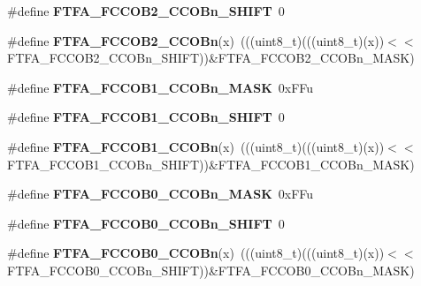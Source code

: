 \begin{DoxyCompactItemize}
\#define {\bfseries F\+T\+F\+A\+\_\+\+F\+C\+C\+O\+B2\+\_\+\+C\+C\+O\+Bn\+\_\+\+S\+H\+I\+FT}~0
\item 
\mbox{\label{group___f_t_f_a___register___masks_ga0b76c510573ac191f77fea543c3d36aa}} 
\#define {\bfseries F\+T\+F\+A\+\_\+\+F\+C\+C\+O\+B2\+\_\+\+C\+C\+O\+Bn}(x)~(((uint8\+\_\+t)(((uint8\+\_\+t)(x))$<$$<$F\+T\+F\+A\+\_\+\+F\+C\+C\+O\+B2\+\_\+\+C\+C\+O\+Bn\+\_\+\+S\+H\+I\+FT))\&F\+T\+F\+A\+\_\+\+F\+C\+C\+O\+B2\+\_\+\+C\+C\+O\+Bn\+\_\+\+M\+A\+SK)
\item 
\mbox{\label{group___f_t_f_a___register___masks_ga17fce81c2555358f011d813a6f3904ac}} 
\#define {\bfseries F\+T\+F\+A\+\_\+\+F\+C\+C\+O\+B1\+\_\+\+C\+C\+O\+Bn\+\_\+\+M\+A\+SK}~0x\+F\+Fu
\item 
\mbox{\label{group___f_t_f_a___register___masks_ga077f35706cef4a20a363eb6980f65baf}} 
\#define {\bfseries F\+T\+F\+A\+\_\+\+F\+C\+C\+O\+B1\+\_\+\+C\+C\+O\+Bn\+\_\+\+S\+H\+I\+FT}~0
\item 
\mbox{\label{group___f_t_f_a___register___masks_ga4c29d83b6a844036b07db102da1daf0e}} 
\#define {\bfseries F\+T\+F\+A\+\_\+\+F\+C\+C\+O\+B1\+\_\+\+C\+C\+O\+Bn}(x)~(((uint8\+\_\+t)(((uint8\+\_\+t)(x))$<$$<$F\+T\+F\+A\+\_\+\+F\+C\+C\+O\+B1\+\_\+\+C\+C\+O\+Bn\+\_\+\+S\+H\+I\+FT))\&F\+T\+F\+A\+\_\+\+F\+C\+C\+O\+B1\+\_\+\+C\+C\+O\+Bn\+\_\+\+M\+A\+SK)
\item 
\mbox{\label{group___f_t_f_a___register___masks_ga5b8b3b721c731e331fb126491693baf4}} 
\#define {\bfseries F\+T\+F\+A\+\_\+\+F\+C\+C\+O\+B0\+\_\+\+C\+C\+O\+Bn\+\_\+\+M\+A\+SK}~0x\+F\+Fu
\item 
\mbox{\label{group___f_t_f_a___register___masks_gaab9715b8a9e69d256acd31421b32ce97}} 
\#define {\bfseries F\+T\+F\+A\+\_\+\+F\+C\+C\+O\+B0\+\_\+\+C\+C\+O\+Bn\+\_\+\+S\+H\+I\+FT}~0
\item 
\mbox{\label{group___f_t_f_a___register___masks_gaea8b726f8e7f7efdb8ce4acbabe06495}} 
\#define {\bfseries F\+T\+F\+A\+\_\+\+F\+C\+C\+O\+B0\+\_\+\+C\+C\+O\+Bn}(x)~(((uint8\+\_\+t)(((uint8\+\_\+t)(x))$<$$<$F\+T\+F\+A\+\_\+\+F\+C\+C\+O\+B0\+\_\+\+C\+C\+O\+Bn\+\_\+\+S\+H\+I\+FT))\&F\+T\+F\+A\+\_\+\+F\+C\+C\+O\+B0\+\_\+\+C\+C\+O\+Bn\+\_\+\+M\+A\+SK)
$$
\end{DoxyCompactItemize}
